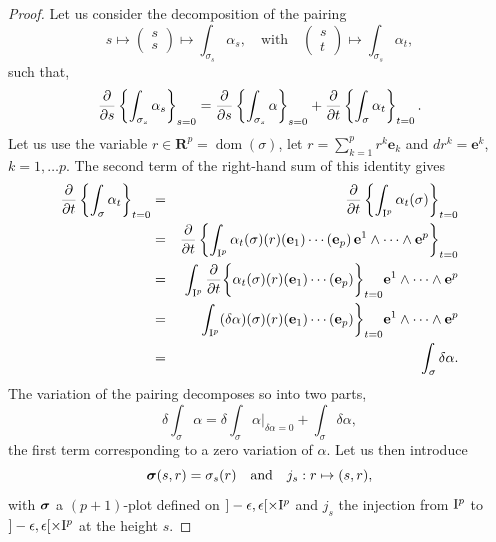 \documentclass[11pt,reqno]{amsart}
\theoremstyle{definition}
\renewcommand{\over}{\above .2pt}
\newcommand{\qmbox}[1]{\quad \mbox{#1}\quad}
\newcommand{\RR}{{\mathbf R}}
\newcommand{\ee}{{\mathbf e}}
\newcommand{\bsigma}{\mbox{\boldmath $\sigma$}}
\newcommand{\cub}[1]{{\rm I}^{#1}}
\newcommand{\dom}{\operatorname{dom}}
\newcommand{\Der}{\partial}
\begin{document}
  \begin{proof}
    Let us consider the
    decomposition of the pairing
    $$
      s \mapsto \begin{pmatrix}s \\ s\end{pmatrix} \mapsto
      \int_{\sigma_s}\alpha_s, \qmbox{with} \begin{pmatrix}s \\ t\end{pmatrix}
      \mapsto \int_{\sigma_s}\alpha_t,
      $$
    such that,
    $$
      {\partial \over \partial s} \left\{
      \int_{\sigma_s}\alpha_s\right\}_{s = 0} = 
      {\Der
      \over \Der s} \left\{ \int_{\sigma_s}\alpha\right\}_{s =
      0} + 
      {\Der \over \Der
      t} \left\{ \int_{\sigma}\alpha_t\right\}_{t = 0}.
      $$
    Let us use the variable $r \in \RR^p = \dom(\sigma)$,
    let $r = \sum_{k=1}^p r^k \ee_k$ and $dr^k = \ee^k$, $k =
      1, \ldots p$. The second term of the right-hand sum of
    this identity gives
    \begin{eqnarray*} 
    {\Der \over \Der t} \left\{\int_{\sigma}\alpha_t\right\}_{t = 0} & = & {\Der \over \Der t} \left\{\int_{\cub{p}}\alpha_t(\sigma) \right\}_{t = 0} \\
      & = & {\Der \over \Der t} \left\{\int_{\cub{p}} \alpha_t(\sigma)(r)(\ee_1)\cdots(\ee_p)\, \ee^1\wedge\cdots \wedge \ee^p \right\}_{t = 0} \\
      & = & \int_{\cub{p}} {\Der \over \Der t} \bigg\{\alpha_t(\sigma)(r)(\ee_1)\cdots(\ee_p)\bigg\}_{t = 0} \ee^1\wedge\cdots \wedge \ee^p \\
      & = & \int_{\cub{p}} (\delta\alpha)(\sigma)(r)(\ee_1)\cdots(\ee_p)\bigg\}_{t = 0} \ee^1\wedge\cdots \wedge \ee^p \\
      & = & \int_\sigma \delta\alpha .
    \end{eqnarray*}
    The variation of the pairing decomposes so into two parts,
    \begin{equation}\tag{$\clubsuit$}
      \delta \int_\sigma \alpha = \delta \int_\sigma \alpha
      \bigg\vert_{\delta \alpha = 0} + \int_\sigma \delta \alpha,
    \end{equation}
    the first term corresponding to a zero variation of $\alpha$. Let us then
    introduce 
    $$
      \bsigma(s,r) = \sigma_s(r)
      \qmbox{and} j_s: r \mapsto (s,r),
      $$
    with $\bsigma$ a $(p+1)$-plot defined on
    $]-\epsilon,\epsilon[ \times \cub{p}$ and $j_s$
    the injection from $\cub{p}$ to $]-\epsilon,\epsilon[ \times \cub{p}$ at the height $s$. 

\end{proof}
\end{document}
